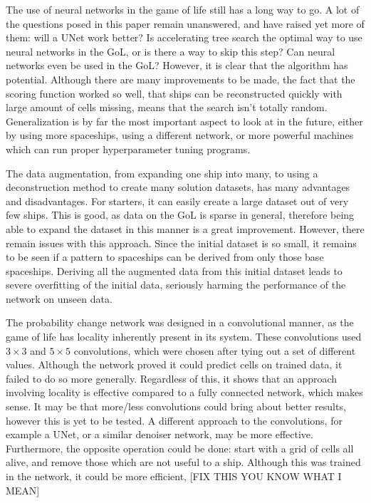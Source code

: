 \documentclass{l4proj}
\begin{document}
The use of neural networks in the game of life still has a long way to go. A lot of the questions posed in this paper remain unanswered, and have raised yet more of them: will a UNet work better? Is accelerating tree search the optimal way to use neural networks in the GoL, or is there a way to skip this step? Can neural networks even be used in the GoL? However, it is clear that the algorithm has potential. Although there are many improvements to be made, the fact that the scoring function worked so well, that ships can be reconstructed quickly with large amount of cells missing, means that the search isn't totally random. Generalization is by far the most important aspect to look at in the future, either by using more spaceships, using a different network, or more powerful machines which can run proper hyperparameter tuning programs.

The data augmentation, from expanding one ship into many, to using a deconstruction method to create many solution datasets, has many advantages and disadvantages. For starters, it can easily create a large dataset out of very few ships. This is good, as data on the GoL is sparse in general, therefore being able to expand the dataset in this manner is a great improvement. However, there remain issues with this approach. Since the initial dataset is so small, it remains to be seen if a pattern to spaceships can be derived from only those base spaceships. Deriving all the augmented data from this initial dataset leads to severe overfitting of the initial data, seriously harming the performance of the network on unseen data.

The probability change network was designed in a convolutional manner, as the game of life has locality inherently present in its system. These convolutions used $3 \times 3$ and $5 \times 5$ convolutions, which were chosen after tying out a set of different values. Although the network proved it could predict cells on trained data, it failed to do so more generally. Regardless of this, it shows that an approach involving locality is effective compared to a fully connected network, which makes sense. It may be that more/less convolutions could bring about better results, however this is yet to be tested. A different approach to the convolutions, for example a UNet, or a similar denoiser network, may be more effective. Furthermore, the opposite operation could be done: start with a grid of cells all alive, and remove those which are not useful to a ship. Although this was trained in the network, it could be more efficient, [FIX THIS YOU KNOW WHAT I MEAN]
\end{document}
